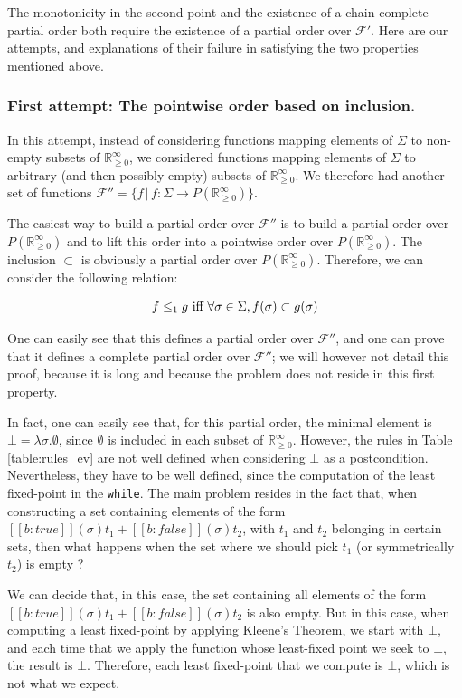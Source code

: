 \documentclass[a4paper,10pt]{llncs}
\def\RRposi {{\mathbb R_{\geq 0}^{\infty}}}
\begin{document}
The monotonicity in the second point and the existence of a chain-complete partial order both require the existence of a partial order over $\mathcal{F'}$. Here are our attempts, and explanations of their failure in satisfying the two properties mentioned above.\bigskip

\subsubsection{First attempt: The pointwise order based on inclusion.}

In this attempt, instead of considering functions mapping elements of $\Sigma$ to non-empty subsets of $\RRposi$, we considered functions mapping elements of $\Sigma$ to arbitrary (and then possibly empty) subsets of $\RRposi$. We therefore had another set of functions $\mathcal{F}'' = \{f \,|\, f : \Sigma \rightarrow P(\RRposi)\}$.\bigskip

The easiest way to build a partial order over $\mathcal{F}''$ is to build a partial order over $P(\RRposi)$ and to lift this order into a pointwise order over $P(\RRposi)$. The inclusion $\subset$ is obviously a partial order over $P(\RRposi)$. Therefore, we can consider the following relation:

$$f \leq_1 g \textnormal{ iff } \forall \sigma \in \Sigma, f(\sigma) \subset g(\sigma)$$

One can easily see that this defines a partial order over $\mathcal{F}''$, and one can prove that it defines a complete partial order over $\mathcal{F}''$; we will however not detail this proof, because it is long and because the problem does not reside in this first property.\bigskip

In fact, one can easily see that, for this partial order, the minimal element is $\bot = \lambda\sigma. \emptyset$, since $\emptyset$ is included in each subset of $\RRposi$. However, the rules in Table \ref{table:rules_ev} are not well defined when considering $\bot$ as a postcondition. Nevertheless, they have to be well defined, since the computation of the least fixed-point in the \texttt{while}. The main problem resides in the fact that, when constructing a set containing elements of the form $[\![b : true ]\!](\sigma)t_1 + [\![b :false ]\!](\sigma)t_2$, with $t_1$ and $t_2$ belonging in certain sets, then what happens when the set where we should pick $t_1$ (or symmetrically $t_2$) is empty ?\bigskip

We can decide that, in this case, the set containing all elements of the form $[\![b : true ]\!](\sigma)t_1 + [\![b :false ]\!](\sigma)t_2$ is also empty. But in this case, when computing a least fixed-point by applying Kleene's Theorem, we start with $\bot$, and each time that we apply the function whose least-fixed point we seek to $\bot$, the result is $\bot$. Therefore, each least fixed-point that we compute is $\bot$, which is not what we expect.\bigskip
\end{document}
